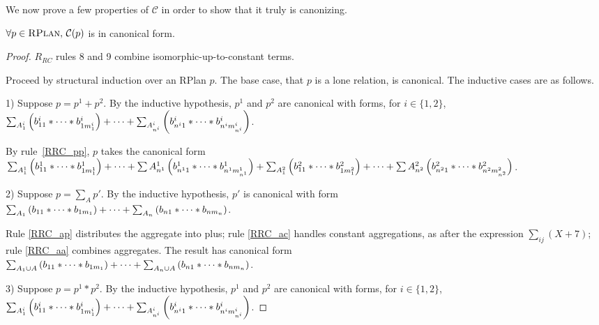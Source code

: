 We now prove a few properties of $\mathcal{C}$ in order to show that it truly is canonizing.

\begin{lemma}
$\forall p \in \textsc{RPlan}{},\, \mathcal{C}(p)$ is in canonical form. 
\end{lemma}
\begin{proof}
$R_{RC}$ rules 8 and 9 combine isomorphic-up-to-constant terms.

Proceed by structural induction over an RPlan $p$.
The base case, that $p$ is a lone relation, is canonical.
The inductive cases are as follows.

1) Suppose $p = p^1 + p^2$. 
By the inductive hypothesis, $p^1$ and $p^2$ are canonical with forms, for $i \in \{1,2\}$, \\ 
$\sum_{A^i_{1}} \left(b^i_{11} * \dots * b^i_{1m^i_{1}}\right) + \dots + \sum_{A^i_{n^i}} \left(b^i_{n^i1} * \dots * b^i_{n^im^i_{n^i}}\right)$.

By rule~\ref{RRC_pp}, $p$ takes the canonical form \\
$\sum_{A^1_{1}} \left(b^1_{11} * \dots * b^1_{1m^1_{1}}\right) + \dots + \sum{A^1_{n^1}} \left(b^1_{n^11} * \dots * b^1_{n^1m^1_{n^1}}\right) +
\sum_{A^2_{1}} \left(b^2_{11} * \dots * b^2_{1m^2_{1}}\right) + \dots + \sum{A^2_{n^2}} \left(b^2_{n^21} * \dots * b^2_{n^2m^2_{n^2}}\right)$.

2) Suppose $p = \sum_A p'$.
By the inductive hypothesis, $p'$ is canonical with form \\
$\sum_{A_1} \left(b_{11} * \dots * b_{1m_1}\right) + \dots + \sum_{A_n} \left(b_{n1} * \dots * b_{nm_n}\right)$.

Rule \ref{RRC_ap} distributes the aggregate into plus;
rule \ref{RRC_ac} handles constant aggregations, as after the expression $\sum_{ij} (X + 7)$;
rule \ref{RRC_aa} combines aggregates.
The result has canonical form \\
$\sum_{A_1 \cup A} \left(b_{11} * \dots * b_{1m_1}\right) + \dots + \sum_{A_n \cup A} \left(b_{n1} * \dots * b_{nm_n}\right)$.

3) Suppose $p = p^1 * p^2$.
By the inductive hypothesis, $p^1$ and $p^2$ are canonical with forms, for $i \in \{1,2\}$, \\ 
$\sum_{A^i_{1}} \left(b^i_{11} * \dots * b^i_{1m^i_{1}}\right) + \dots + \sum_{A^i_{n^i}} \left(b^i_{n^i1} * \dots * b^i_{n^im^i_{n^i}}\right)$.


\end{proof}
